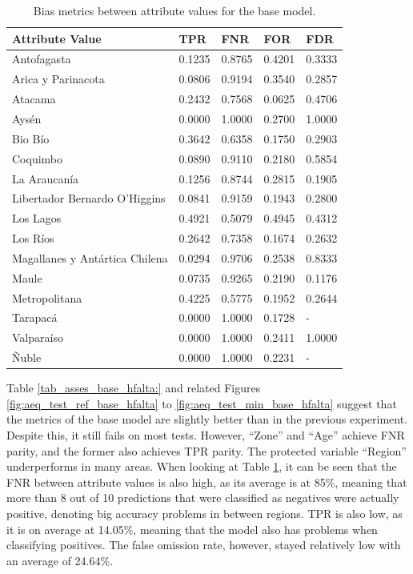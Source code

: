 \documentclass[fleqn,10pt]{wlscirep}
\begin{document}
\begin{table}[!htb]
\centering
\begin{tabular}{|p{3.5cm}|p{1cm}|p{1cm}|p{1cm}|p{1cm}|}
\hline

        \textbf{Attribute Value} &    \textbf{TPR} &    \textbf{FNR} &    \textbf{FOR} &    \textbf{FDR} \\
\hline
                   Antofagasta & 0.1235 & 0.8765 & 0.4201 & 0.3333 \\
            Arica y Parinacota & 0.0806 & 0.9194 & 0.3540 & 0.2857 \\
                       Atacama & 0.2432 & 0.7568 & 0.0625 & 0.4706 \\
                         Aysén & 0.0000 & 1.0000 & 0.2700 & 1.0000 \\
                       Bio Bío & 0.3642 & 0.6358 & 0.1750 & 0.2903 \\
                      Coquimbo & 0.0890 & 0.9110 & 0.2180 & 0.5854 \\
                  La Araucanía & 0.1256 & 0.8744 & 0.2815 & 0.1905 \\
 Libertador Bernardo O'Higgins & 0.0841 & 0.9159 & 0.1943 & 0.2800 \\
                     Los Lagos & 0.4921 & 0.5079 & 0.4945 & 0.4312 \\
                      Los Ríos & 0.2642 & 0.7358 & 0.1674 & 0.2632 \\
Magallanes y Antártica Chilena & 0.0294 & 0.9706 & 0.2538 & 0.8333 \\
                         Maule & 0.0735 & 0.9265 & 0.2190 & 0.1176 \\
                 Metropolitana & 0.4225 & 0.5775 & 0.1952 & 0.2644 \\
                      Tarapacá & 0.0000 & 1.0000 & 0.1728 &    - \\
                    Valparaíso & 0.0000 & 1.0000 & 0.2411 & 1.0000 \\
                         Ñuble & 0.0000 & 1.0000 & 0.2231 &    - \\

\hline
\end{tabular}
\caption{Bias metrics between attribute values for the base model.}
\label{tab_region_hfalta_base:}
\end{table}

Table \ref{tab_asses_base_hfalta:} and related Figures \ref{fig:aeq_test_ref_base_hfalta} to \ref{fig:aeq_test_min_base_hfalta} suggest that the metrics of the base model are slightly better than in the previous experiment. Despite this, it still fails on most tests. However, ``Zone'' and ``Age'' achieve FNR parity, and the former also achieves TPR parity. The protected variable ``Region'' underperforms in many areas. When looking at Table \ref{tab_region_hfalta_base:}, it can be seen that the FNR between attribute values is also high, as its average is at 85\%, meaning that more than 8 out of 10 predictions that were classified as negatives were actually positive, denoting big accuracy problems in between regions. TPR is also low, as it is on average at 14.05\%, meaning that the model also has problems when classifying positives. The false omission rate, however, stayed relatively low with an average of 24.64\%.
\end{document}
